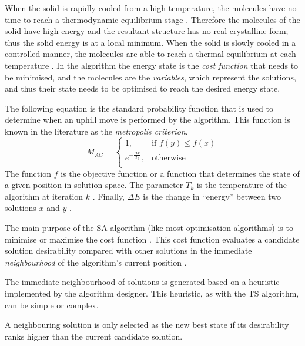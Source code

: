 When the solid is rapidly cooled from a high temperature, the molecules have no time to reach a thermodynamic equilibrium stage \cite{MobileRobotSA,ConstantTempSA}. Therefore the molecules of the solid have high energy and the resultant structure has no real crystalline form; thus the solid energy is at a local minimum\cite{CurveFittingSA,NewSAs,MobileRobotSA}. When the solid is slowly cooled in a controlled manner, the molecules are able to reach a thermal equilibrium at each temperature \cite{ChaosSA,CurveFittingSA,NewSAs}.
In the algorithm the energy state is the \emph{cost function} that needs to be minimised, and the molecules are the \emph{variables}, which represent the solutions, and thus their state needs to be optimised to reach the desired energy state.

The following equation is the standard probability function that is used to determine when an uphill move is performed by the algorithm. This function is known in the literature as the \emph{metropolis criterion}. 
\begin{equation}
\label{eq:saprobability}
	M_{AC} =
	\begin{cases}
	1, &\text{if $f(y) \leq f(x)$}\\
	e^{-\frac{\Delta E}{T_k}} , &\text{otherwise}\\
	\end{cases}
\end{equation}
The function $f$ is the objective function or a function that determines the state of a given position in solution space\cite{EcoEquilSA}. The parameter $T_k$ is the temperature of the algorithm at iteration $k$ \cite{EcoEquilSA}. Finally, $\Delta E$ is the change in ``energy'' between two solutions $x$ and $y$ \cite{EcoEquilSA}.

The main purpose of the \gls{SA} algorithm (like most optimisation algorithms) is to minimise or maximise the cost function \cite{SASingleMultiObj}. This cost function evaluates a candidate solution desirability compared with other solutions in the immediate \emph{neighbourhood} of the algorithm's current position \cite{TheoPraticalSA}. 

The immediate neighbourhood of solutions is generated based on a heuristic implemented by the algorithm designer\cite{AIModernApproach}. This heuristic, as with the \gls{TS} algorithm, can be simple or complex.

A neighbouring solution is only selected as the new best state if its desirability ranks higher than the current candidate solution.

